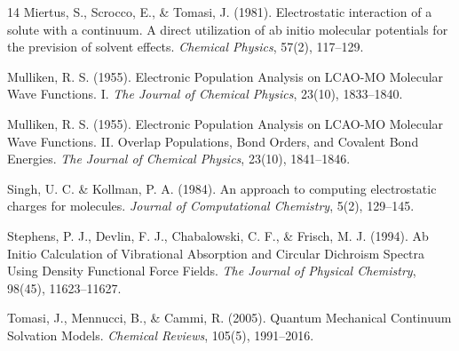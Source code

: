 \documentclass[aspectratio=169, 9pt]{beamer}
\begin{document}
\begin{frame}[allowframebreaks]
\begin{thebibliography}{14}
 Miertus, S., Scrocco, E., \& Tomasi, J. (1981). Electrostatic interaction of a solute with a continuum. A direct utilization of ab initio molecular potentials for the prevision of solvent effects. \textit{Chemical Physics}, 57(2), 117--129.

 Mulliken, R. S. (1955). Electronic Population Analysis on LCAO-MO Molecular Wave Functions. I. \textit{The Journal of Chemical Physics}, 23(10), 1833--1840.

 Mulliken, R. S. (1955). Electronic Population Analysis on LCAO-MO Molecular Wave Functions. II. Overlap Populations, Bond Orders, and Covalent Bond Energies. \textit{The Journal of Chemical Physics}, 23(10), 1841--1846.

 Singh, U. C. \& Kollman, P. A. (1984). An approach to computing electrostatic charges for molecules. \textit{Journal of Computational Chemistry}, 5(2), 129--145.

 Stephens, P. J., Devlin, F. J., Chabalowski, C. F., \& Frisch, M. J. (1994). Ab Initio Calculation of Vibrational Absorption and Circular Dichroism Spectra Using Density Functional Force Fields. \textit{The Journal of Physical Chemistry}, 98(45), 11623--11627.

 Tomasi, J., Mennucci, B., \& Cammi, R. (2005). Quantum Mechanical Continuum Solvation Models. \textit{Chemical Reviews}, 105(5), 1991--2016.

\end{thebibliography}
\end{frame}
\end{document}
